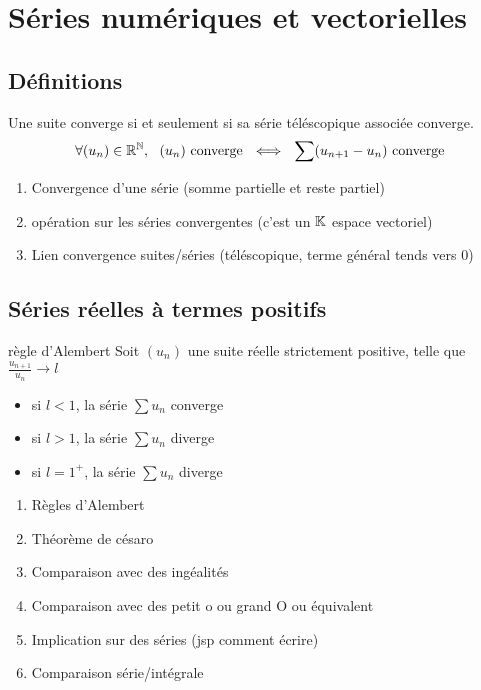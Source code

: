 \section{Séries numériques et vectorielles}

\subsection{Définitions}

\begin{proposition}{}{}
    Une suite converge si et seulement si sa série téléscopique associée converge.
    \[ \forall (u_n) \in \mathbb{R}^{\mathbb{N}}, ~~ (u_n) \text{ converge} ~~ \Longleftrightarrow ~~ \sum(u_{n+1} - u_n) \text{ converge} \]
\end{proposition}

\begin{enumerate}
    \item Convergence d'une série (somme partielle et reste partiel)
    \item opération sur les séries convergentes (c'est un $\mathbb{K}$ espace vectoriel)
    \item Lien convergence suites/séries (téléscopique, terme général tends vers 0)
\end{enumerate}

\subsection{Séries réelles à termes positifs}


\begin{proposition}{règle d'Alembert}{}
    Soit $(u_n)$ une suite réelle strictement positive, telle que $\frac{u_{n+1}}{u_n} \longrightarrow l$
    \begin{itemize}
        \item si $l < 1$, la série $\sum u_n$ converge
        \item si $l > 1$, la série $\sum u_n$ diverge
        \item si $l = 1^+$, la série $\sum u_n$ diverge
    \end{itemize}
\end{proposition}
\begin{enumerate}
    \item Règles d'Alembert
    \item Théorème de césaro
    \item Comparaison avec des ingéalités
    \item Comparaison avec des petit o ou grand O ou équivalent
    \item Implication sur des séries (jsp comment écrire)
    \item Comparaison série/intégrale
\end{enumerate}


